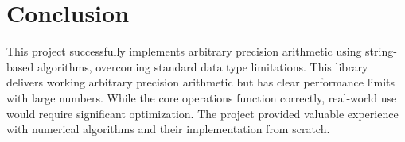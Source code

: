 \documentclass{article}
\begin{document}
\section{Conclusion}
This project successfully implements arbitrary precision arithmetic using string-based algorithms, overcoming standard data type limitations. 
This library delivers working arbitrary precision arithmetic but has clear performance limits with large numbers. 
While the core operations function correctly, real-world use would require significant optimization. The project provided valuable experience with numerical algorithms and their implementation from scratch.
\end{document}
